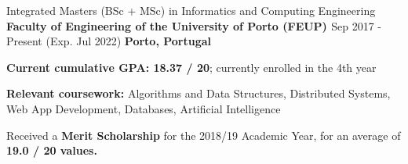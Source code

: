 

\begin{cventries}

  \cventry
    {Integrated Masters (BSc + MSc) in Informatics and Computing Engineering} %
    {\textbf{Faculty of Engineering of the University of Porto (FEUP) \href{https://sigarra.up.pt/feup/en/web_page.inicial}{\faExternalLink}}} %
    {Sep 2017 - Present (Exp. Jul 2022)} %
    {\textbf{Porto, Portugal}} %
    {
      \begin{cvitems} %
        \item {\textbf{Current cumulative GPA: 18.37 / 20}; currently enrolled in the 4th year}
        \item {\textbf{Relevant coursework:} Algorithms and Data Structures, Distributed Systems, Web App Development, Databases, Artificial Intelligence}
        \item {Received a \textbf{Merit Scholarship} for the 2018/19 Academic Year, for an average of \textbf{19.0 / 20 values.}}
      \end{cvitems}
    }

\end{cventries}
